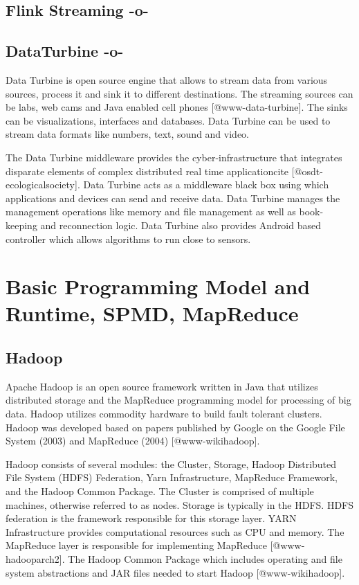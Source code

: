     
\subsection{Flink Streaming -o-}



\subsection{DataTurbine -o-}

Data Turbine is open source engine that allows to stream data from
various sources, process it and sink it to different destinations. The
streaming sources can be labs, web cams and Java enabled cell
phones [@www-data-turbine].  The sinks can be visualizations,
interfaces and databases.  Data Turbine can be used to stream data
formats like numbers, text, sound and video.

The Data Turbine middleware provides the cyber-infrastructure that
integrates disparate elements of complex distributed real time
applicationcite [@osdt-ecologicalsociety]. Data Turbine acts as a
middleware black box using which applications and devices can send and
receive data. Data Turbine manages the management operations like
memory and file management as well as book-keeping and reconnection
logic.  Data Turbine also provides Android based controller which
allows algorithms to run close to sensors.




\section{Basic Programming Model and Runtime, SPMD, MapReduce}


\subsection{Hadoop}

Apache Hadoop is an open source framework written in Java that
utilizes distributed storage and the MapReduce programming model for
processing of big data. Hadoop utilizes commodity hardware to build
fault tolerant clusters.  Hadoop was developed based on papers
published by Google on the Google File System (2003) and MapReduce
(2004) [@www-wikihadoop].

Hadoop consists of several modules: the Cluster, Storage, Hadoop
Distributed File System (HDFS) Federation, Yarn Infrastructure,
MapReduce Framework, and the Hadoop Common Package.  The Cluster is
comprised of multiple machines, otherwise referred to as nodes.
Storage is typically in the HDFS.  HDFS federation is the framework
responsible for this storage layer.  YARN Infrastructure provides
computational resources such as CPU and memory. The MapReduce layer is
responsible for implementing MapReduce [@www-hadooparch2].  The
Hadoop Common Package which includes operating and file system
abstractions and JAR files needed to start Hadoop
 [@www-wikihadoop].


